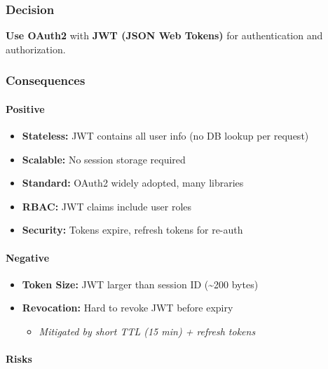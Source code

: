 \documentclass[
]{article}
\providecommand{\tightlist}{%
  \setlength{\itemsep}{0pt}\setlength{\parskip}{0pt}}
\begin{document}
\hypertarget{decision-11}{%
\subsubsection{Decision}\label{decision-11}}

\textbf{Use OAuth2} with \textbf{JWT (JSON Web Tokens)} for
authentication and authorization.

\hypertarget{consequences-11}{%
\subsubsection{Consequences}\label{consequences-11}}

\hypertarget{positive-11}{%
\paragraph{Positive}\label{positive-11}}

\begin{itemize}
\tightlist
\item
  \textbf{Stateless:} JWT contains all user info (no DB lookup per
  request)
\item
  \textbf{Scalable:} No session storage required
\item
  \textbf{Standard:} OAuth2 widely adopted, many libraries
\item
  \textbf{RBAC:} JWT claims include user roles
\item
  \textbf{Security:} Tokens expire, refresh tokens for re-auth
\end{itemize}

\hypertarget{negative-11}{%
\paragraph{Negative}\label{negative-11}}

\begin{itemize}
\tightlist
\item
  \textbf{Token Size:} JWT larger than session ID (\textasciitilde200
  bytes)
\item
  \textbf{Revocation:} Hard to revoke JWT before expiry

  \begin{itemize}
  \tightlist
  \item
    \emph{Mitigated by short TTL (15 min) + refresh tokens}
  \end{itemize}
\end{itemize}

\hypertarget{risks-11}{%
\paragraph{Risks}\label{risks-11}}
\end{document}
